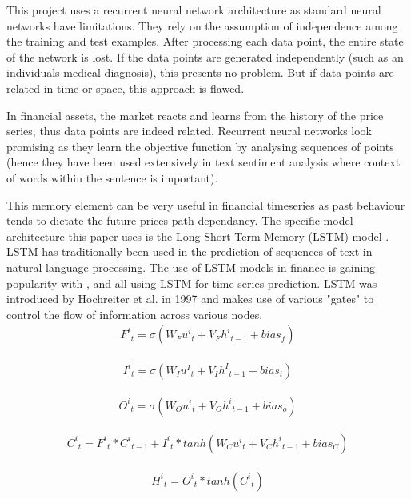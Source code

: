 \documentclass[11pt]{article}
\begin{document}
This project uses a recurrent neural network architecture as standard neural networks have limitations. They rely on the assumption of independence among the training and test examples. After processing each data point, the entire state of the network is lost. If the data points are generated independently (such as an individuals medical diagnosis), this presents no problem. But if data points are related in time or space, this approach is flawed.\par In financial assets, the market reacts and learns from the history of the price series, thus data points are indeed related. Recurrent neural networks look promising as they learn the objective function by analysing sequences of points (hence they have been used extensively in text sentiment analysis where context of words within the sentence is important). \par This memory element can be very useful in financial timeseries as past behaviour tends to dictate the future prices path dependancy. The specific model architecture this paper uses is the Long Short Term Memory (LSTM) model \cite{Hochreiter1997}. LSTM has traditionally been used in the prediction of sequences of text in natural language processing. The use of LSTM models in finance is gaining popularity with \cite{Fischer2018}, \cite{Lim2019} and \cite{Kucharczyk2019} all using LSTM for time series prediction. LSTM was introduced by Hochreiter et al. in 1997 \cite{Hochreiter1997} and makes use of various "gates" to control the flow of information across various nodes.
\begin{align}
{F^{i}}_{t} =  \sigma(W_{F}{u^{i}}_{t} + V_{F}{h^{i}}_{t-1} + bias_{f})
\end{align} 

\begin{align}
{I^{i}}_{t} =  \sigma(W_{I}{u^{I}}_{t} + V_{I}{h^{I}}_{t-1} + bias_{i})
\end{align} 

\begin{align}
{O^{i}}_{t} =  \sigma(W_{O}{u^{i}}_{t} + V_{O}{h^{i}}_{t-1} + bias_{o})
\end{align} 

\begin{align}
{C^{i}}_{t} = {F^{i}}_{t} *{C^{i}}_{t-1} + {I^{i}}_{t} *tanh(W_{C}{u^{i}}_{t} + V_{C}{h^{i}}_{t-1} + bias_{C})
\end{align}

\begin{align}
{H^{i}}_{t} = {O^{i}}_{t}*tanh({C^{i}}_{t})
\end{align}
\end{document}
